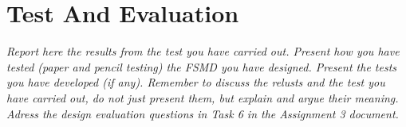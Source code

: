 \documentclass[a4paper, english]{article}
\numberwithin{equation}{section}
\begin{document}
\section{Test And Evaluation}
\textit{Report here the results from the test you have carried out. Present how you have tested (paper and pencil testing) the FSMD you have designed. Present the tests you have developed (if any). Remember to discuss the relusts and the test you have carried out, do not just present them, but explain and argue their meaning. Adress the design evaluation questions in Task 6 in the Assignment 3 document.}



%
%




%
\end{document}
